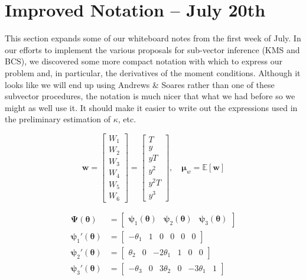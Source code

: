 \documentclass[12pt]{article}
\begin{document}
\section{Improved Notation -- July 20th}
This section expands some of our whiteboard notes from the first week of July.
In our efforts to implement the various proposals for sub-vector inference (KMS and BCS), we discovered some more compact notation with which to express our problem and, in particular, the derivatives of the moment conditions.
Although it looks like we will end up using Andrews \& Soares rather than one of these subvector procedures, the notation is much nicer that what we had before so we might as well use it.
It should make it easier to write out the expressions used in the preliminary estimation of $\kappa$, etc.

\[
  \mathbf{w} = 
  \left[
  \begin{array}{c}
    W_1\\ W_2\\ W_3\\ W_4\\ W_5\\ W_6
  \end{array}
\right] = 
  \left[
  \begin{array}{c}
    T\\ y \\ yT\\  y^2 \\ y^2 T \\ y^3
  \end{array}
\right], \quad \boldsymbol{\mu}_w = \mathbb{E}[\mathbf{w}]
\]

\begin{align*}
  \boldsymbol{\Psi}(\boldsymbol{\theta}) &= \left[
\begin{array}{ccc}
  \boldsymbol{\psi}_1(\boldsymbol{\theta}) &
  \boldsymbol{\psi}_2(\boldsymbol{\theta}) &
  \boldsymbol{\psi}_3(\boldsymbol{\theta})
\end{array}
\right]\\
  \boldsymbol{\psi}_1'(\boldsymbol{\theta}) &= \left[
  \begin{array}{cccccc}
   -\theta_1 & 1 & 0 & 0 & 0 & 0 
  \end{array}
\right] \\
  \boldsymbol{\psi}_2'(\boldsymbol{\theta}) &= \left[
  \begin{array}{cccccc}
   \theta_2 & 0 & -2\theta_1 & 1 & 0 & 0
  \end{array}
\right] \\
  \boldsymbol{\psi}_3'(\boldsymbol{\theta}) &= \left[
  \begin{array}{cccccc}
   -\theta_3 & 0 & 3\theta_2 & 0 & -3\theta_1 & 1
  \end{array}
\right] 
\end{align*}
\end{document}
